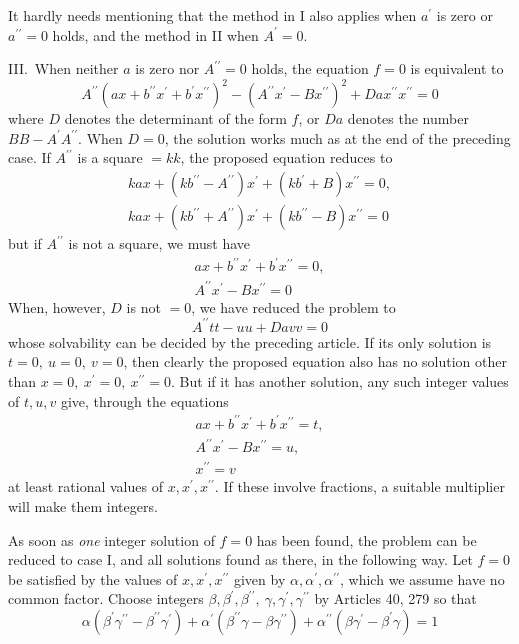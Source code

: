 It hardly needs mentioning that the method in I also applies when \(a^\prime\) is zero or \(a^{\prime\prime}=0\) holds, and the method in II when \(A^\prime=0\).

III.\ When neither \(a\) is zero nor \(A^{\prime\prime}=0\) holds, the equation \(f=0\) is equivalent to
\[A^{\prime\prime}(ax+b^{\prime\prime}x^\prime+b^\prime x^{\prime\prime})^2-(A^{\prime\prime}x^\prime-Bx^{\prime\prime})^2+Da x^{\prime\prime}x^{\prime\prime}=0\]
where \(D\) denotes the determinant of the form \(f\), or \(Da\) denotes the number \(BB-A^\prime A^{\prime\prime}\). When \(D=0\), the solution works much as at the end of the preceding case. If \(A^{\prime\prime}\) is a square \(=kk\), the proposed equation reduces to
\[\begin{gathered}kax+(kb^{\prime\prime}-A^{\prime\prime})x^\prime+(kb^\prime+B)x^{\prime\prime}=0,\\ kax+(kb^{\prime\prime}+A^{\prime\prime})x^\prime+(kb^{\prime\prime}-B)x^{\prime\prime}=0\end{gathered}\]
but if \(A^{\prime\prime}\) is not a square, we must have
\[\begin{gathered}ax+b^{\prime\prime}x^\prime+b^\prime x^{\prime\prime}=0,\\ A^{\prime\prime}x^\prime-Bx^{\prime\prime}=0\end{gathered}\]
When, however, \(D\) is not \(=0\), we have reduced the problem to
\[A^{\prime\prime}tt-uu+Davv=0\]
whose solvability can be decided by the preceding article. If its only solution is \(t=0,\ u=0,\ v=0\), then clearly the proposed equation also has no solution other than \(x=0,\ x^\prime=0,\ x^{\prime\prime}=0\). But if it has another solution, any such integer values of \(t,u,v\) give, through the equations
\[\begin{gathered}ax+b^{\prime\prime}x^\prime+b^\prime x^{\prime\prime}=t,\\ A^{\prime\prime}x^\prime-Bx^{\prime\prime}=u,\\ x^{\prime\prime}=v\end{gathered}\]
at least rational values of \(x,x^\prime,x^{\prime\prime}\). If these involve fractions, a suitable multiplier will make them integers.

As soon as \textit{one} integer solution of \(f=0\) has been found, the problem can be reduced to case I, and all solutions found as there, in the following way. Let \(f=0\) be satisfied by the values of \(x,x^\prime,x^{\prime\prime}\) given by \(\alpha,\alpha^\prime,\alpha^{\prime\prime}\), which we assume have no common factor. Choose integers \(\beta,\beta^\prime,\beta^{\prime\prime},\ \gamma,\gamma^\prime,\gamma^{\prime\prime}\) by Articles 40, 279 so that
\[\alpha(\beta^\prime\gamma^{\prime\prime}-\beta^{\prime\prime}\gamma^\prime)+\alpha^\prime(\beta^{\prime\prime}\gamma-\beta\gamma^{\prime\prime})+\alpha^{\prime\prime}(\beta\gamma^\prime-\beta^\prime\gamma)=1\]

